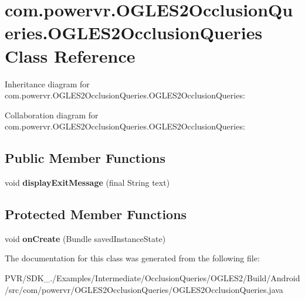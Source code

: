 \hypertarget{classcom_1_1powervr_1_1_o_g_l_e_s2_occlusion_queries_1_1_o_g_l_e_s2_occlusion_queries}{\section{com.\+powervr.\+O\+G\+L\+E\+S2\+Occlusion\+Queries.\+O\+G\+L\+E\+S2\+Occlusion\+Queries Class Reference}
\label{classcom_1_1powervr_1_1_o_g_l_e_s2_occlusion_queries_1_1_o_g_l_e_s2_occlusion_queries}
}


Inheritance diagram for com.\+powervr.\+O\+G\+L\+E\+S2\+Occlusion\+Queries.\+O\+G\+L\+E\+S2\+Occlusion\+Queries\+:


Collaboration diagram for com.\+powervr.\+O\+G\+L\+E\+S2\+Occlusion\+Queries.\+O\+G\+L\+E\+S2\+Occlusion\+Queries\+:
\subsection*{Public Member Functions}
\begin{DoxyCompactItemize}
\item 
\hypertarget{classcom_1_1powervr_1_1_o_g_l_e_s2_occlusion_queries_1_1_o_g_l_e_s2_occlusion_queries_adb0cae3b559f2e8bc6b0e3ccaad98c44}{void {\bfseries display\+Exit\+Message} (final String text)}\label{classcom_1_1powervr_1_1_o_g_l_e_s2_occlusion_queries_1_1_o_g_l_e_s2_occlusion_queries_adb0cae3b559f2e8bc6b0e3ccaad98c44}

\end{DoxyCompactItemize}
\subsection*{Protected Member Functions}
\begin{DoxyCompactItemize}
\item 
\hypertarget{classcom_1_1powervr_1_1_o_g_l_e_s2_occlusion_queries_1_1_o_g_l_e_s2_occlusion_queries_a5743f2b2cc71bbe641479e428cd2d8a3}{void {\bfseries on\+Create} (Bundle saved\+Instance\+State)}\label{classcom_1_1powervr_1_1_o_g_l_e_s2_occlusion_queries_1_1_o_g_l_e_s2_occlusion_queries_a5743f2b2cc71bbe641479e428cd2d8a3}

\end{DoxyCompactItemize}


The documentation for this class was generated from the following file\+:\begin{DoxyCompactItemize}
\item 
P\+V\+R/\+S\+D\+K\+\_./\+Examples/\+Intermediate/\+Occlusion\+Queries/\+O\+G\+L\+E\+S2/\+Build/\+Android/src/com/powervr/\+O\+G\+L\+E\+S2\+Occlusion\+Queries/O\+G\+L\+E\+S2\+Occlusion\+Queries.\+java\end{DoxyCompactItemize}
